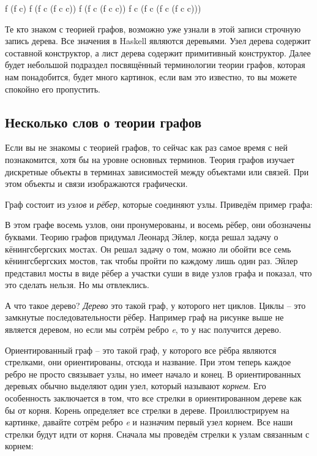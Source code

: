 \begin{code}
f (f c)
f (f c (f c c))
f (f c (f c c))
f c (f c (f c (f c c)))
\end{code}

Те кто знаком с теорией графов, возможно уже узнали в 
этой записи строчную запись дерева. Все значения в Haskell
являются деревьями. Узел дерева содержит составной конструктор, 
а лист дерева содержит примитивный конструктор. 
Далее будет небольшой подраздел посвящённый терминологии теории
графов, которая нам понадобится, будет много картинок, 
если вам это известно, то вы можете спокойно его пропустить.

\subsection{Несколько слов о теории графов}

Если вы не знакомы с теорией графов, то сейчас как раз 
самое время с ней познакомится, хотя бы на  уровне основных 
терминов. Теория графов изучает дискретные объекты в терминах
зависимостей между объектами или связей. При этом объекты и 
связи изображаются графически. 

Граф состоит из \emph{узлов} и \emph{рёбер}, которые соединяют
узлы. Приведём пример графа:


В этом графе восемь узлов, они пронумерованы, и восемь рёбер, они обозначены
буквами. Теорию графов придумал Леонард Эйлер, когда решал задачу
о кёнингсбергских мостах. Он решал задачу о том, можно ли обойти 
все семь кёнингсбергских мостов, так чтобы пройти по каждому лишь 
один раз. Эйлер представил мосты в виде рёбер а участки суши в виде
узлов графа и показал, что это сделать нельзя. Но мы отвлеклись. 

А что такое дерево? 
\emph{Дерево} это такой граф, у которого нет циклов. Циклы -- это
замкнутые последовательности рёбер. Например граф на рисунке
выше не является деревом, но если мы сотрём ребро \emph{e}, то у
нас получится дерево.

Ориентированный граф -- это такой граф, у которого все рёбра 
являются стрелками, они ориентированы, отсюда и название. 
При этом теперь каждое ребро не просто связывает узлы, но
имеет начало и конец. В ориентированных деревьях обычно выделяют
один узел, который называют \emph{корнем}. Его особенность заключается
в том, что все стрелки в ориентированном дереве как бы 
от корня. Корень определяет все стрелки в дереве. Проиллюстрируем
на картинке, давайте сотрём ребро \emph{e} и назначим первый
узел корнем. Все наши стрелки будут идти от корня. Сначала мы
проведём стрелки к узлам связанным с корнем:

